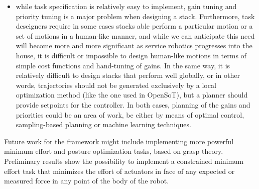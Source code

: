\documentclass[%
	paper=A4,					%
	twoside=true,				%
	openright,			.
	parskip=full,				%
	chapterprefix=true,			%
	11pt,						%
	headings=normal,			%
	bibliography=totoc,			%
	listof=totoc,				%
	titlepage=on,				%
	captions=tableabove,		%
	draft=true,				%
]{scrreprt}%
\begin{document}
\begin{itemize}
 \item while task specification is relatively easy to implement, gain tuning and priority tuning is a major problem when designing a stack. Furthermore, task deseigners require in some cases stacks able perform a particular motion or a set of motions in a human-like manner, and while we can anticipate this need will become more and more significant as service robotics progresses into the house, it is difficult or impossible to design human-like motions in terms of simple cost functions and hand-tuning of gains. In the same way, it is relatively difficult to design stacks that perform well globally, or in other words, trajectories should not be generated exclusively by a local optimization method (like the one used in OpenSoT), but a planner should provide setpoints for the controller. In both cases, planning of the gains and priorities could be an area of work, be either by means of optimal control, sampling-based planning or machine learning techniques.
\end{itemize}
Future work for the framework might include implementing more powerful minimum effort and posture optimization tasks, based on grasp theory. Preliminary results show the possibility to implement a constrained minimum effort task that minimizes the effort of actuators in face of any expected or measured force in any point of the body of the robot.

\cleardoublepage

{%
\renewcommand{\bibfont}{\normalfont\small}
\setlength{\biblabelsep}{0pt}
\setlength{\bibitemsep}{0.5\baselineskip plus 0.5\baselineskip}
\printbibliography[nottype=online]
\printbibliography[heading=subbibliography,title={Websites},type=online,prefixnumbers={@}]
}
\cleardoublepage



%

%

\end{document}
